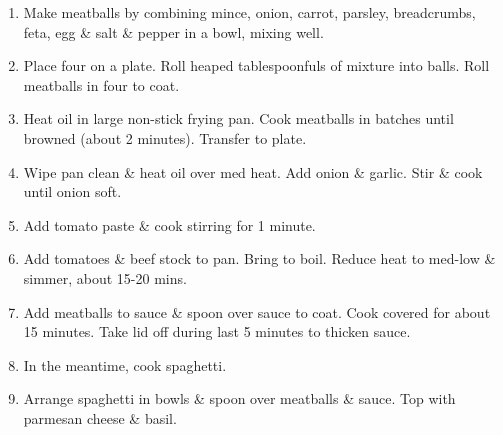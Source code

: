 \documentclass[11pt,a4paper]{article}
\begin{document}
\begin{enumerate}

  \item Make meatballs by combining mince, onion, carrot, parsley, breadcrumbs,
    feta, egg {\&} salt {\&} pepper in a bowl, mixing well.

  \item Place four on a plate. Roll heaped tablespoonfuls of mixture into balls.
    Roll meatballs in four to coat.

  \item Heat oil in large non-stick frying pan. Cook meatballs in batches until
    browned (about 2 minutes). Transfer to plate.

  \item Wipe pan clean {\&} heat oil over med heat. Add onion {\&} garlic. Stir
    {\&} cook until onion soft.

  \item Add tomato paste {\&} cook stirring for 1 minute.

  \item Add tomatoes {\&} beef stock to pan. Bring to boil. Reduce heat to
    med-low {\&} simmer, about 15-20 mins.

  \item Add meatballs to sauce {\&} spoon over sauce to coat. Cook covered for
    about 15 minutes. Take lid off during last 5 minutes to thicken sauce.

  \item In the meantime, cook spaghetti.

  \item Arrange spaghetti in bowls {\&} spoon over meatballs {\&} sauce. Top
    with parmesan cheese {\&} basil.

\end{enumerate}
\end{document}

